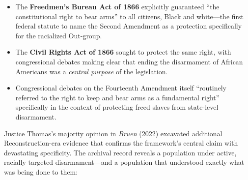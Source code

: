 \documentclass[12pt,openany]{book}
\begin{document}
\begin{itemize}
    \item The \textbf{Freedmen's Bureau Act of 1866} explicitly guaranteed ``the constitutional right to bear arms'' to all citizens, Black and white---the first federal statute to name the Second Amendment as a protection specifically for the racialized Out-group.
    \item The \textbf{Civil Rights Act of 1866} sought to protect the same right, with congressional debates making clear that ending the disarmament of African Americans was a \textit{central purpose} of the legislation.
    \item Congressional debates on the Fourteenth Amendment itself ``routinely referred to the right to keep and bear arms as a fundamental right'' specifically in the context of protecting freed slaves from state-level disarmament.
\end{itemize}

Justice Thomas's majority opinion in \textit{Bruen} (2022) excavated additional Reconstruction-era evidence that confirms the framework's central claim with devastating specificity. The archival record reveals a population under active, racially targeted disarmament---and a population that understood exactly what was being done to them:
\end{document}
